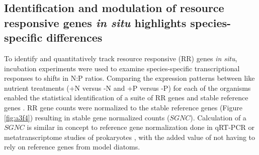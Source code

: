 \subsection{Identification and modulation of resource responsive genes \textit{in situ} highlights species-specific differences}
To identify and quantitatively track resource responsive (RR) genes \textit{in situ}, incubation experiments were used to examine species-specific transcriptional responses to shifts in N:P ratios. Comparing the expression patterns between like nutrient treatments (+N versus -N and +P versus -P) for each of the organisms enabled the statistical identification of a suite of RR genes \citep{Wu2010} and stable reference genes \citep{Alexander2012}. RR gene counts were normalized to the stable reference genes (Figure \ref{fig:a3f4}) resulting in stable gene normalized counts ($SGNC$). Calculation of a $SGNC$ is similar in concept to reference gene normalization done in qRT-PCR \citep{Bustin2000} or metatranscriptome studies of prokaryotes \citep{McCarren2010}, with the added value of not having to rely on reference genes from model diatoms.\par
